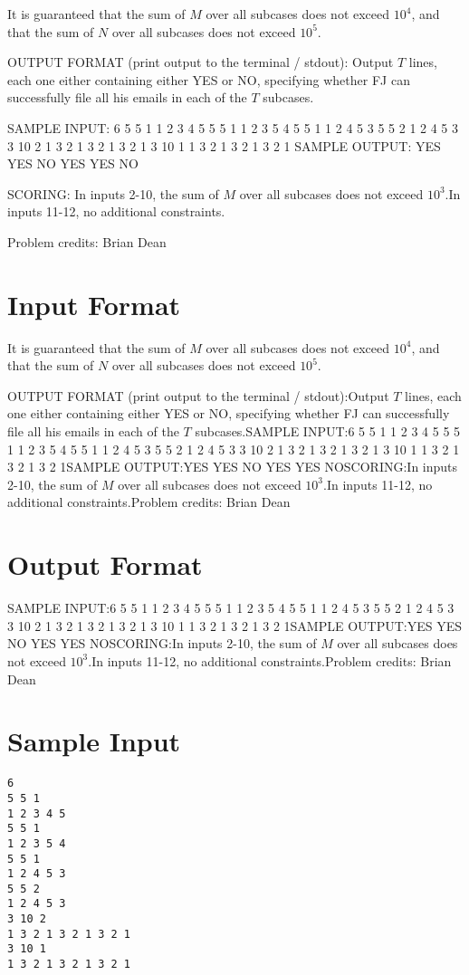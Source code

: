 \documentclass[12pt]{article}
\begin{document}
It is guaranteed that the sum of $M$ over all subcases does not exceed $10^4$,
and that the sum of $N$ over all subcases does not exceed $10^5$.

OUTPUT FORMAT (print output to the terminal / stdout):
Output $T$ lines, each one either containing either YES or NO, specifying
whether FJ can successfully file all his emails in each of the $T$ subcases.

SAMPLE INPUT:
6
5 5 1
1 2 3 4 5
5 5 1
1 2 3 5 4
5 5 1
1 2 4 5 3
5 5 2
1 2 4 5 3
3 10 2
1 3 2 1 3 2 1 3 2 1
3 10 1
1 3 2 1 3 2 1 3 2 1
SAMPLE OUTPUT: 
YES
YES
NO
YES
YES
NO

SCORING:
In inputs 2-10, the sum of $M$ over all subcases does not exceed
$10^3$.In inputs 11-12, no additional constraints.


Problem credits: Brian Dean



\section*{Input Format}
It is guaranteed that the sum of $M$ over all subcases does not exceed $10^4$,
and that the sum of $N$ over all subcases does not exceed $10^5$.

OUTPUT FORMAT (print output to the terminal / stdout):Output $T$ lines, each one either containing either YES or NO, specifying
whether FJ can successfully file all his emails in each of the $T$ subcases.SAMPLE INPUT:6
5 5 1
1 2 3 4 5
5 5 1
1 2 3 5 4
5 5 1
1 2 4 5 3
5 5 2
1 2 4 5 3
3 10 2
1 3 2 1 3 2 1 3 2 1
3 10 1
1 3 2 1 3 2 1 3 2 1SAMPLE OUTPUT:YES
YES
NO
YES
YES
NOSCORING:In inputs 2-10, the sum of $M$ over all subcases does not exceed
$10^3$.In inputs 11-12, no additional constraints.Problem credits: Brian Dean

\section*{Output Format}
SAMPLE INPUT:6
5 5 1
1 2 3 4 5
5 5 1
1 2 3 5 4
5 5 1
1 2 4 5 3
5 5 2
1 2 4 5 3
3 10 2
1 3 2 1 3 2 1 3 2 1
3 10 1
1 3 2 1 3 2 1 3 2 1SAMPLE OUTPUT:YES
YES
NO
YES
YES
NOSCORING:In inputs 2-10, the sum of $M$ over all subcases does not exceed
$10^3$.In inputs 11-12, no additional constraints.Problem credits: Brian Dean

\section*{Sample Input}
\begin{verbatim}
6
5 5 1
1 2 3 4 5
5 5 1
1 2 3 5 4
5 5 1
1 2 4 5 3
5 5 2
1 2 4 5 3
3 10 2
1 3 2 1 3 2 1 3 2 1
3 10 1
1 3 2 1 3 2 1 3 2 1
\end{verbatim}
\end{document}
